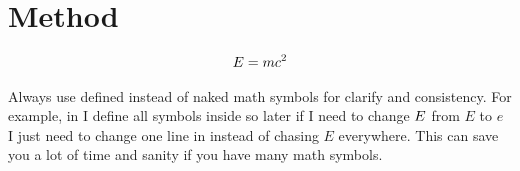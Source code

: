 \section{Method}
\label{sec:method}

\begin{align}
E = m c^2
\label{eqn:emc2}
\end{align}

Always use defined instead of naked math symbols for clarify and consistency.
For example, in  I define all symbols inside  so later if I need to change $E$ from $E$ to $e$ I just need to change one line in  instead of chasing $E$ everywhere.
This can save you a lot of time and sanity if you have many math symbols.


